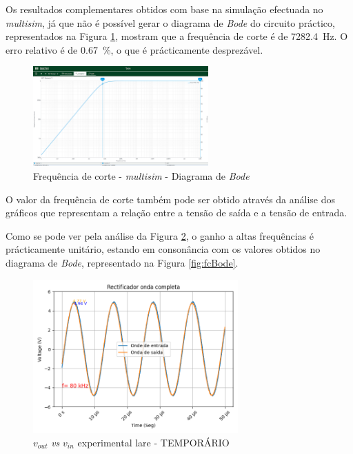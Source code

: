 Os resultados complementares obtidos com base na simulação efectuada no \textit{multisim}, já que não é possível gerar o diagrama de \textit{Bode} do circuito práctico, representados na Figura \ref{fig:fcBodemultisim}, mostram que a frequência de corte é de \SI{7282.4}{\hertz}. O erro relativo é de \SI{0.67}{\percent}, o que é prácticamente desprezável.

\begin{figure}[hbtp]
	\centering
	\includegraphics[width=0.6\textwidth]{figures/boda_HPF_fc.png}
	\caption{Frequência de corte - \textit{multisim} - Diagrama de \textit{Bode}}
	\label{fig:fcBodemultisim}
\end{figure}

O valor da frequência de corte também pode ser obtido através da análise dos gráficos que representam a relação entre a tensão de saída e a tensão de entrada. 

Como se pode ver pela análise da Figura \ref{fig:voutvinlare}, o ganho a altas frequências é prácticamente unitário, estando em consonância com os valores obtidos no diagrama de \textit{Bode}, representado na Figura \ref{fig:fcBode}. 

\begin{figure}[hbtp]
	\centering
	\includegraphics[width=0.7\textwidth]{figures/filtro_passa-alto.png}
	\caption{$v_{out}$ \textit{vs} $v_{in}$ experimental \acrshort{lare} - TEMPORÁRIO}
	\label{fig:voutvinlare}
\end{figure}

